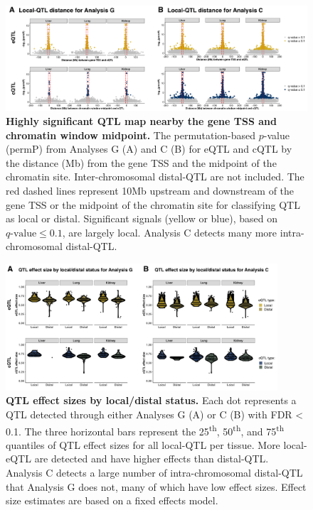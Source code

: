 \documentclass[10pt,letterpaper,twoside]{article}
\begin{document}
\begin{figure}[hp]
\renewcommand{\familydefault}{\sfdefault}\normalfont
\centering
\includegraphics[width=\textwidth]{figs/qtl_distance_all.png}
\caption{\textbf{Highly significant QTL map nearby the gene TSS and chromatin window midpoint.} 
The permutation-based $p$-value (permP) from Analyses G (A) and C (B) for eQTL and cQTL by the distance (Mb) from the gene TSS and the midpoint of the chromatin site. Inter-chromosomal distal-QTL are not included. The red dashed lines represent 10Mb upstream and downstream of the gene TSS or the midpoint of the chromatin site for classifying QTL as local or distal. Significant signals (yellow or blue), based on $q\text{-value} \le 0.1$, are largely local. Analysis C detects many more intra-chromosomal distal-QTL.
\label{fig:dist_all}}
\end{figure}

\clearpage

\begin{figure}[hp]
\renewcommand{\familydefault}{\sfdefault}\normalfont
\centering
\includegraphics[width=0.9\textwidth, trim={0in 0.25in 0in 0in}, clip]{figs/qtl_effect_sizes_local_v_distal.png}
\caption{\textbf{QTL effect sizes by local/distal status.} 
Each dot represents a QTL detected through either Analyses G (A) or C (B) with FDR < 0.1. The three horizontal bars represent the 25\textsuperscript{th}, 50\textsuperscript{th}, and 75\textsuperscript{th} quantiles of QTL effect sizes for all local-QTL per tissue. More local-eQTL are detected and have higher effects than distal-QTL. Analysis C detects a large number of intra-chromosomal distal-QTL that Analysis G does not, many of which have low effect sizes. Effect size estimates are based on a fixed effects model.
\label{fig:qtl_effect_sizes_local_v_distal}}
\end{figure}
\end{document}
